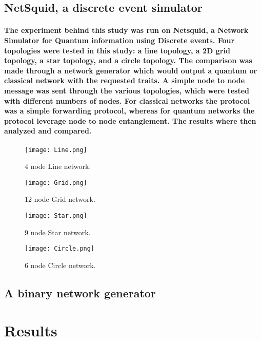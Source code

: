 \documentclass{article}
\begin{document}
\begin{multicols}{2}
    \subsection*{NetSquid, a discrete event simulator}
    \paragraph{The experiment behind this study was run on Netsquid\cite{Netsquid}, a Network Simulator for Quantum information using Discrete events.
    Four topologies were tested in this study: a line topology, a 2D grid topology, a star topology, and a circle topology. 
    The comparison was made through a network generator which would output a quantum or classical network with the requested traits.
    A simple node to node message was sent through the various topologies, which were tested with different numbers of nodes. 
    For classical networks the protocol was a simple forwarding protocol, whereas for quantum networks the protocol leverage node to node entanglement.
    The results where then analyzed and compared.
    }

    \begin{figure}
    \centering
    \texttt{[image: Line.png]}
    \caption{\label{f1} $4$ node Line network.} 
    \end{figure}

    \begin{figure}
    \centering
    \texttt{[image: Grid.png]}
    \caption{$12$ node Grid network. \label{f2}} 
    \end{figure}

    \begin{figure}
    \centering
    \texttt{[image: Star.png]}
    \caption{$9$ node Star network. \label{f3}} 
    \end{figure}

    \begin{figure}
    \centering
    \texttt{[image: Circle.png]}
    \caption{$6$ node Circle network. \label{f4}} 
    \end{figure}

    \subsection*{A binary network generator}

    \section{Results}


\end{multicols}
\end{document}
